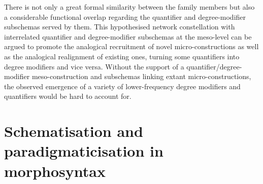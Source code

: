 \documentclass[output=paper]{langsci/langscibook}
\begin{document}
There is not only a great formal similarity between the family members but also a considerable functional overlap regarding the quantifier and degree\hyp{}modifier subschemas served by them. This hypothesised network constellation with interrelated quantifier and degree\hyp{}modifier subschemas at the meso-level can be argued to promote the analogical recruitment of novel micro\hyp{}constructions as well as the analogical realignment of existing ones, turning some quantifiers into degree modifiers and vice versa. Without the support of a quantifier\slash degree\hyp{}modifier meso-construction and subschemas linking extant micro\hyp{}constructions, the observed emergence of a variety of lower-frequency degree modifiers and quantifiers would be hard to account for. 


\section{Schematisation and paradigmaticisation in morphosyntax} \label{sec4}
\end{document}
